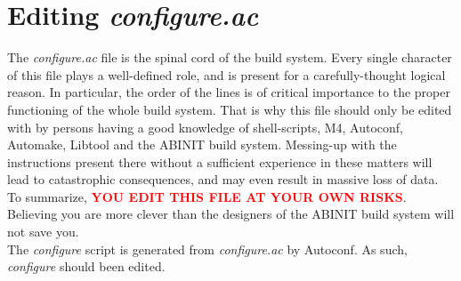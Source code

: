 \section{Editing \textit{configure.ac}}

The \textit{configure.ac} file is the spinal cord of the build system.
Every single character of this file plays a well-defined role, and
is present for a carefully-thought logical reason. In particular,
the order of the lines is of critical importance to the proper functioning
of the whole build system. That is why this file should only be edited
with \textbf{} by persons having a good knowledge
of shell-scripts, M4, Autoconf, Automake, Libtool and the ABINIT build
system. Messing-up with the instructions present there without a sufficient
experience in these matters will \textbf{} lead
to catastrophic consequences, and may even result in massive loss
of data. To summarize, \textbf{\textcolor{red}{YOU EDIT THIS FILE
AT YOUR OWN RISKS}}. Believing you are more clever than the designers
of the ABINIT build system will not save you.\\


The \textit{configure} script is generated from \textit{configure.ac}
by Autoconf. As such, \textit{configure} should \textbf{} been edited. 
